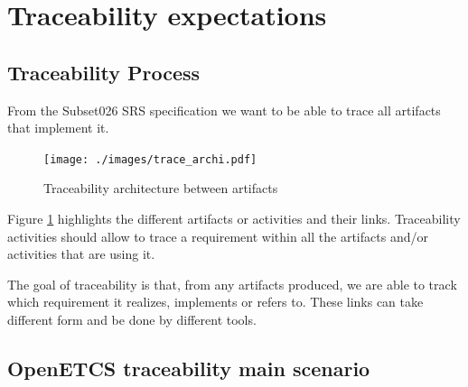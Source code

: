 \documentclass[11pt]{template/openetcs_report}
\begin{document}
\section{Traceability expectations}

\subsection{Traceability Process}
\label{sec-2-2-1}
From the Subset026 SRS specification we want to be able to trace all artifacts
that implement it.
\begin{figure}[htb]
\centering
\texttt{[image: ./images/trace\_archi.pdf]}
\caption{\label{fig:trace_process}Traceability architecture between artifacts}
\end{figure}

Figure  \ref{fig:trace_process} highlights the different artifacts or activities and their
links. Traceability activities should allow to trace a requirement within all
the artifacts and/or activities that are using it.

The goal of traceability is that, from any artifacts produced, we are able to
track which requirement it realizes, implements  or refers to. These links can
take different form and be done by different tools. 

\subsection{OpenETCS traceability main scenario}
\label{sec-2-2-2}
\end{document}
